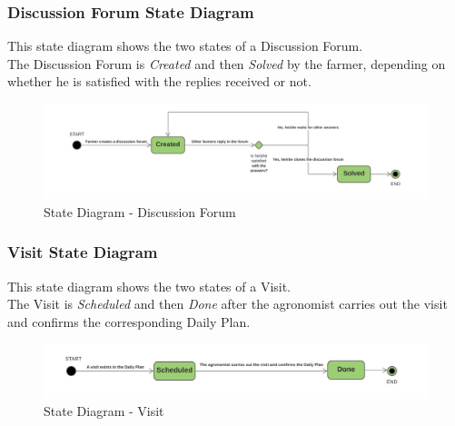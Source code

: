 \subsubsection{Discussion Forum State Diagram}
This state diagram shows the two states of a Discussion Forum.\\
The Discussion Forum is \textit{Created} and then \textit{Solved} by the farmer, depending on whether he is satisfied with the replies received or not.
\begin{figure}[h!]
  \includegraphics[width=\textwidth,height=\textheight,keepaspectratio]{./Images/State Chart DiscussionForum.png}
  \caption{State Diagram - Discussion Forum}
\end{figure}

\subsubsection{Visit State Diagram}
This state diagram shows the two states of a Visit.\\
The Visit is \textit{Scheduled} and then \textit{Done} after the agronomist carries out the visit and confirms the corresponding Daily Plan.
\begin{figure}[h!]
  \includegraphics[width=\textwidth,height=\textheight,keepaspectratio]{./Images/State Chart Visit.png}
  \caption{State Diagram - Visit}
\end{figure}
